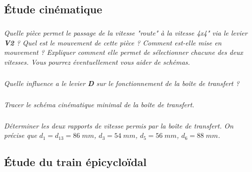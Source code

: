 \documentclass[10pt]{article}
\begin{document}
\subsection{Étude cinématique}



\subparagraph{}
\textit{Quelle pièce permet le passage de la vitesse "route" à la vitesse 4x4" via le levier \textbf{V2} ? Quel est le mouvement de cette pièce ? Comment est-elle mise en mouvement ? Expliquer comment elle permet de sélectionner chacune des deux vitesses. Vous pourrez éventuellement vous aider de schémas.}

\subparagraph{}
\textit{Quelle influence a le levier \textbf{D} sur le fonctionnement de la boîte de transfert ?}


\subparagraph{}
\textit{Tracer le schéma cinématique minimal de la boîte de transfert.}


\subparagraph{}
\textit{Déterminer les deux rapports de vitesse permis par la boîte de transfert. On précise que $d_1 = d_{13} = 86\; mm$, $d_3=54\; mm$, $d_5=56\; mm$, $d_6=88\; mm$.}


\subsection{Étude du train épicycloïdal}
\end{document}
